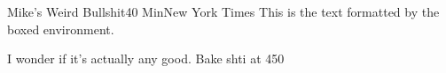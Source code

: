 \documentclass[]{mikescards}
\begin{document}
\begin{recipe}{Mike's Weird Bullshit}{40 Min}{New York Times}
This is the text formatted by the boxed environment.

I wonder if it's actually any good.
Bake shti at 450\textdegree

\blindtext[4]
\end{recipe}
\end{document}
